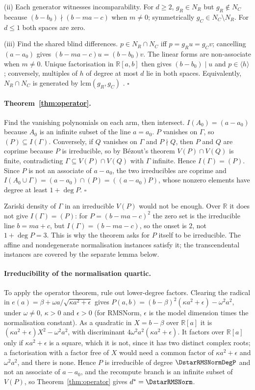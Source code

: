 (ii) Each generator witnesses incomparability. For $d\ge2$, $g_R\in N_R$ but $g_R\notin N_C$ because
$(b-b_0)\nmid(b-ma-c)$ when $m\neq0$; symmetrically $g_C\in N_C\setminus N_R$. For $d\le1$ both spaces are zero.

(iii) Find the shared blind differences. $p\in N_R\cap N_C$ iff $p=g_Ru=g_Cv$; cancelling $(a-a_0)$ gives
$(b-ma-c)u=(b-b_0)v$. The linear forms are non-associate when $m\neq0$. Unique factorisation in $\mathbb R[a,b]$
then gives $(b-b_0)\mid u$ and $p\in\langle h\rangle$; conversely, multiples of $h$ of degree at most $d$ lie in both spaces.
Equivalently, $N_R\cap N_C$ is generated by $\mathrm{lcm}(g_R,g_C)$ \citep{pistone1996groebner}. $\square$

\paragraph{Theorem~\ref{thm:operator}.} Find the vanishing polynomials on each arm, then intersect.
$I(A_0)=(a-a_0)$ because $A_0$ is an infinite subset of the line $a=a_0$.
$P$ vanishes on $\Gamma$, so $(P)\subseteq I(\Gamma)$. Conversely, if $Q$ vanishes on $\Gamma$ and $P\nmid Q$, then $P$
and $Q$ are coprime because $P$ is irreducible, so by B\'ezout's theorem $V(P)\cap V(Q)$ is finite, contradicting
$\Gamma\subseteq V(P)\cap V(Q)$ with $\Gamma$ infinite. Hence $I(\Gamma)=(P)$. Since $P$ is not an associate of
$a-a_0$, the two irreducibles are coprime and $I(A_0\cup\Gamma)=(a-a_0)\cap(P)=((a-a_0)P)$, whose nonzero elements
have degree at least $1+\deg P$. $\square$

Zariski density of $\Gamma$ in an irreducible $V(P)$ would not be enough. Over $\mathbb R$ it does
not give $I(\Gamma)=(P)$: for $P=(b-ma-c)^2$ the zero set is the irreducible line $b=ma+c$, but $I(\Gamma)=(b-ma-c)$,
so the onset is $2$, not $1+\deg P=3$. This is why the theorem asks for $P$ itself to be irreducible. The affine and
nondegenerate normalisation instances satisfy it; the transcendental instances are covered by the separate lemma below.

\paragraph{Irreducibility of the normalisation quartic.} To apply the operator theorem, rule out lower-degree
factors. Clearing the radical in
$e(a)=\beta+\omega a/\sqrt{\kappa a^2+\epsilon}$ gives $P(a,b)=(b-\beta)^2(\kappa a^2+\epsilon)-\omega^2a^2$, under
$\omega\neq0$, $\kappa>0$ and $\epsilon>0$ (for RMSNorm, $\epsilon$ is the model dimension times the normalisation
constant). As a quadratic in $X=b-\beta$ over $\mathbb R[a]$ it is $(\kappa a^2+\epsilon)X^2-\omega^2a^2$, with
discriminant $4\omega^2a^2(\kappa a^2+\epsilon)$. It factors over $\mathbb R[a]$ only if $\kappa a^2+\epsilon$ is a
square, which it is not, since it has two distinct complex roots; a factorisation with a factor free of $X$ would
need a common factor of $\kappa a^2+\epsilon$ and $\omega^2a^2$, and there is none. Hence $P$ is irreducible of degree
$\DstarRMSNormDegP$ and not an associate of $a-a_0$, and the recompute branch is an infinite subset of $V(P)$, so
Theorem~\ref{thm:operator} gives $d^*=\DstarRMSNorm$.

